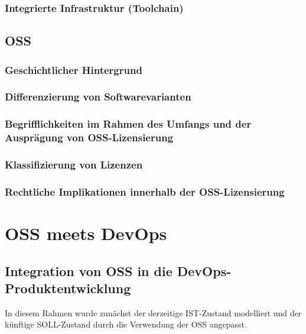 \documentclass[12pt,titlepage]{article}
\begin{document}
\subsubsection{Integrierte Infrastruktur (Toolchain)}



\subsection{OSS}


\subsubsection{Geschichtlicher Hintergrund}


\subsubsection{Differenzierung von Softwarevarianten}


\newpage
\subsubsection{Begrifflichkeiten im Rahmen des Umfangs und der Ausprägung von OSS-Lizensierung}


\subsubsection{Klassifizierung von Lizenzen}


\subsubsection{Rechtliche Implikationen innerhalb der OSS-Lizensierung}


\section{OSS meets DevOps}


\subsection{Integration von OSS in die DevOps-Produktentwicklung}
In diesem Rahmen wurde zunächst der derzeitige IST-Zustand modelliert und der künftige SOLL-Zustand durch die Verwendung der OSS angepasst.
\end{document}
